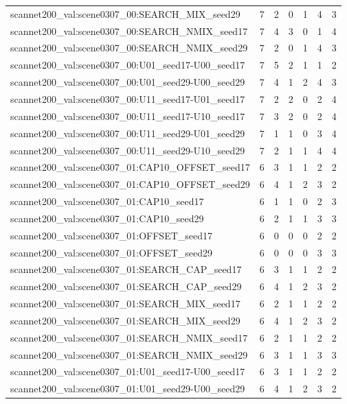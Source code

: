 \begin{table}[t]
\begin{tabular}{lrrrrrr}
scannet200\_val:scene0307\_00:SEARCH\_MIX\_seed29 & 7 & 2 & 0 & 1 & 4 & 3 \\
scannet200\_val:scene0307\_00:SEARCH\_NMIX\_seed17 & 7 & 4 & 3 & 0 & 1 & 4 \\
scannet200\_val:scene0307\_00:SEARCH\_NMIX\_seed29 & 7 & 2 & 0 & 1 & 4 & 3 \\
scannet200\_val:scene0307\_00:U01\_seed17-U00\_seed17 & 7 & 5 & 2 & 1 & 1 & 2 \\
scannet200\_val:scene0307\_00:U01\_seed29-U00\_seed29 & 7 & 4 & 1 & 2 & 4 & 3 \\
scannet200\_val:scene0307\_00:U11\_seed17-U01\_seed17 & 7 & 2 & 2 & 0 & 2 & 4 \\
scannet200\_val:scene0307\_00:U11\_seed17-U10\_seed17 & 7 & 3 & 2 & 0 & 2 & 4 \\
scannet200\_val:scene0307\_00:U11\_seed29-U01\_seed29 & 7 & 1 & 1 & 0 & 3 & 4 \\
scannet200\_val:scene0307\_00:U11\_seed29-U10\_seed29 & 7 & 2 & 1 & 1 & 4 & 4 \\
scannet200\_val:scene0307\_01:CAP10\_OFFSET\_seed17 & 6 & 3 & 1 & 1 & 2 & 2 \\
scannet200\_val:scene0307\_01:CAP10\_OFFSET\_seed29 & 6 & 4 & 1 & 2 & 3 & 2 \\
scannet200\_val:scene0307\_01:CAP10\_seed17 & 6 & 1 & 1 & 0 & 2 & 3 \\
scannet200\_val:scene0307\_01:CAP10\_seed29 & 6 & 2 & 1 & 1 & 3 & 3 \\
scannet200\_val:scene0307\_01:OFFSET\_seed17 & 6 & 0 & 0 & 0 & 2 & 2 \\
scannet200\_val:scene0307\_01:OFFSET\_seed29 & 6 & 0 & 0 & 0 & 3 & 3 \\
scannet200\_val:scene0307\_01:SEARCH\_CAP\_seed17 & 6 & 3 & 1 & 1 & 2 & 2 \\
scannet200\_val:scene0307\_01:SEARCH\_CAP\_seed29 & 6 & 4 & 1 & 2 & 3 & 2 \\
scannet200\_val:scene0307\_01:SEARCH\_MIX\_seed17 & 6 & 2 & 1 & 1 & 2 & 2 \\
scannet200\_val:scene0307\_01:SEARCH\_MIX\_seed29 & 6 & 4 & 1 & 2 & 3 & 2 \\
scannet200\_val:scene0307\_01:SEARCH\_NMIX\_seed17 & 6 & 2 & 1 & 1 & 2 & 2 \\
scannet200\_val:scene0307\_01:SEARCH\_NMIX\_seed29 & 6 & 3 & 1 & 1 & 3 & 3 \\
scannet200\_val:scene0307\_01:U01\_seed17-U00\_seed17 & 6 & 3 & 1 & 1 & 2 & 2 \\
scannet200\_val:scene0307\_01:U01\_seed29-U00\_seed29 & 6 & 4 & 1 & 2 & 3 & 2 \\

\end{tabular}
\end{table}
